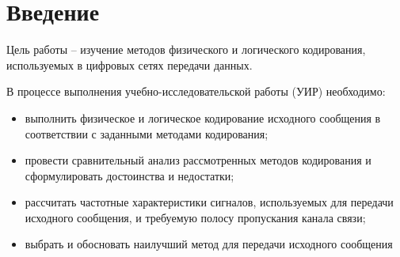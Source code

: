 \section{Введение}

Цель работы – изучение методов физического и логического кодирования, используемых в цифровых сетях передачи данных.

В процессе выполнения учебно-исследовательской работы (УИР) необходимо: 

\begin{itemize}
	\item выполнить физическое и логическое кодирование исходного сообщения в соответствии с заданными методами кодирования; 
	\item провести сравнительный анализ рассмотренных методов кодирования и сформулировать достоинства и недостатки; 
	\item рассчитать частотные характеристики сигналов, используемых для передачи исходного сообщения, и требуемую полосу пропускания канала связи; 
	\item выбрать и обосновать наилучший метод для передачи исходного сообщения
\end{itemize}
